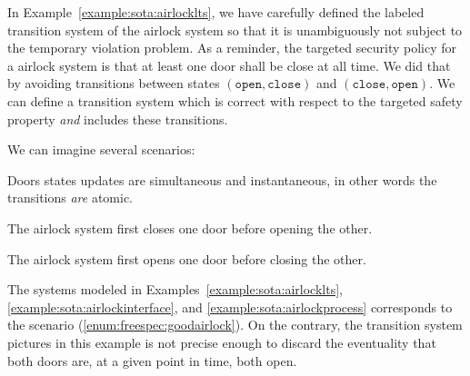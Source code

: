 \begin{example}
  In Example~\ref{example:sota:airlocklts}, we have carefully defined the
  labeled transition system of the airlock system so that it is unambiguously
  not subject to the temporary violation problem.
  As a reminder, the targeted security policy for a airlock system is that at
  least one door shall be close at all time.
  We did that by avoiding transitions between states
  \( (\mathtt{open}, \mathtt{close}) \) and
  \( (\mathtt{close}, \mathtt{open}) \).
  We can define a transition system which is correct with respect to the
  targeted safety property \emph{and} includes these transitions.

  \begin{center}
  \end{center}

  We can imagine several scenarios:
  \begin{inparaenum}[(1)]
  \item Doors states updates are simultaneous and instantaneous, in other words
    the transitions \emph{are} atomic.
  \item The airlock system first closes one door before opening the
    other. \label{enum:freespec:goodairlock}
  \item The airlock system first opens one door before closing the
    other. \label{enum:freespec:badairlock}
  \end{inparaenum}
  The systems modeled in Examples~\ref{example:sota:airlocklts},
  \ref{example:sota:airlockinterface}, and \ref{example:sota:airlockprocess}
  corresponds to the scenario (\ref{enum:freespec:goodairlock}).
  On the contrary, the transition system pictures in this example is not precise
  enough to discard the eventuality that both doors are, at a given point in
  time, both open.
\end{example}

